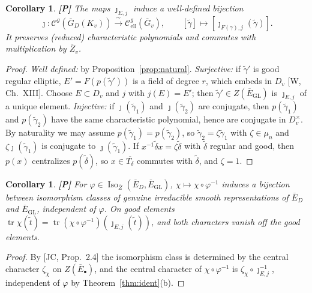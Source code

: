 \documentclass[12pt]{article}
\newcommand{\ov}[1]{\overline{#1}}
\newcommand{\tr}{\operatorname{tr}}
\newcommand{\Iso}{\operatorname{Iso}}
\newcommand{\GL}{\mathrm{GL}}
\newcommand{\Gb}{\ov{G}}
\newcommand{\Zb}{\ov{Z}}
\newcommand{\GDb}{\ov{G}_D}
\newcommand{\Eb}{\ov{E}}
\newcommand{\jj}{\jmath}
\newcommand{\Pv}{\textbf{[P]}}
\theoremstyle{plain}
\newtheorem{corollary}[theorem]{Corollary}
\theoremstyle{definition}
\begin{document}
\begin{corollary}\label{cor:classes}\Pv
The maps $\jj_{E,j}$ induce a well-defined bijection
\[ \jj:\mathcal C^{g}(\GDb(K_v))\xrightarrow{\ \sim\ }\mathcal C^{g}_{\mathrm{ell}}(\Gb_v),\qquad [\tilde\gamma]\mapsto[\jj_{F(\gamma),j}(\tilde\gamma)]. \]
It preserves (reduced) characteristic polynomials and commutes with multiplication by $\Zb_v$.
\end{corollary}
\begin{proof}
\emph{Well defined:} by Proposition~\ref{prop:natural}. \emph{Surjective:} if $\tilde\gamma'$ is good regular elliptic, $E'=F(p(\tilde\gamma'))$ is a field of degree $r$, which embeds in $D_v$ [W, Ch.~XIII]. Choose $E\subset D_v$ and $j$ with $j(E)=E'$; then $\tilde\gamma'\in Z(\Eb_{\GL})$ is $\jj_{E,j}$ of a unique element. \emph{Injective:} if $\jj(\tilde\gamma_1)$ and $\jj(\tilde\gamma_2)$ are conjugate, then $p(\tilde\gamma_1)$ and $p(\tilde\gamma_2)$ have the same characteristic polynomial, hence are conjugate in $D_v^\times$. By naturality we may assume $p(\tilde\gamma_1)=p(\tilde\gamma_2)$, so $\tilde\gamma_2=\zeta\tilde\gamma_1$ with $\zeta\in\mu_n$ and $\zeta\jj(\tilde\gamma_1)$ is conjugate to $\jj(\tilde\gamma_1)$. If $x^{-1}\tilde\delta x=\zeta\tilde\delta$ with $\tilde\delta$ regular and good, then $p(x)$ centralizes $p(\tilde\delta)$, so $x\in\ov{T_\delta}$ commutes with $\tilde\delta$, and $\zeta=1$.
\end{proof}

\begin{corollary}\label{cor:reps}\Pv
For $\varphi\in\Iso_{\Zb}(\Eb_D,\Eb_{\GL})$, $\chi\mapsto\chi\circ\varphi^{-1}$ induces a bijection between isomorphism classes of genuine irreducible smooth representations of $\Eb_D$ and $\Eb_{\GL}$, independent of $\varphi$. On good elements $\tr\chi(\tilde t)=\tr(\chi\circ\varphi^{-1})(\jj_{E,j}(\tilde t))$, and both characters vanish off the good elements.
\end{corollary}
\begin{proof}
By [JC, Prop.~2.4] the isomorphism class is determined by the central character $\zeta_\chi$ on $Z(\Eb_\bullet)$, and the central character of $\chi\circ\varphi^{-1}$ is $\zeta_\chi\circ\jj_{E,j}^{-1}$, independent of $\varphi$ by Theorem~\ref{thm:ident}(b).
\end{proof}

\end{document}
